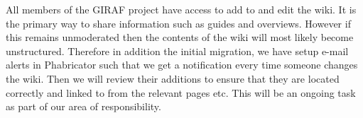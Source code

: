 All members of the GIRAF project have access to add to and edit the wiki. 
It is the primary way to share information such as guides and overviews. 
However if this remains unmoderated then the contents of the wiki will most likely become unstructured. 
Therefore in addition the initial migration, we have setup e-mail alerts in Phabricator such that we get a notification every time someone changes the wiki.
Then we will review their additions to ensure that they are located correctly and linked to from the relevant pages etc. 
This will be an ongoing task as part of our area of responsibility.